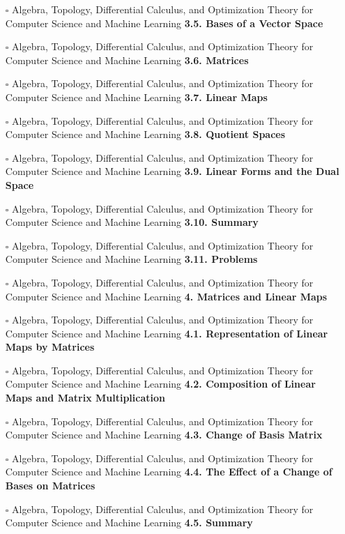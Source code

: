\documentclass[a4, landscape, 12pt]{article}
\newcommand{\checkbox}{$\square$}%
\begin{document}
\begin{itemize}
{}
\item [\checkbox]  Algebra, Topology, Differential Calculus, and Optimization Theory for Computer Science and Machine Learning \textbf{ 3.5. Bases of a Vector Space
}
\item [\checkbox]  Algebra, Topology, Differential Calculus, and Optimization Theory for Computer Science and Machine Learning \textbf{ 3.6. Matrices
}
\item [\checkbox]  Algebra, Topology, Differential Calculus, and Optimization Theory for Computer Science and Machine Learning \textbf{ 3.7. Linear Maps
}
\item [\checkbox]  Algebra, Topology, Differential Calculus, and Optimization Theory for Computer Science and Machine Learning \textbf{ 3.8. Quotient Spaces
}
\item [\checkbox]  Algebra, Topology, Differential Calculus, and Optimization Theory for Computer Science and Machine Learning \textbf{ 3.9. Linear Forms and the Dual Space
}
\item [\checkbox]  Algebra, Topology, Differential Calculus, and Optimization Theory for Computer Science and Machine Learning \textbf{ 3.10. Summary
}
\item [\checkbox]  Algebra, Topology, Differential Calculus, and Optimization Theory for Computer Science and Machine Learning \textbf{ 3.11. Problems
}
\item [\checkbox]  Algebra, Topology, Differential Calculus, and Optimization Theory for Computer Science and Machine Learning \textbf{ 4. Matrices and Linear Maps
}
\item [\checkbox]  Algebra, Topology, Differential Calculus, and Optimization Theory for Computer Science and Machine Learning \textbf{ 4.1. Representation of Linear Maps by Matrices
}
\item [\checkbox]  Algebra, Topology, Differential Calculus, and Optimization Theory for Computer Science and Machine Learning \textbf{ 4.2. Composition of Linear Maps and Matrix Multiplication
}
\item [\checkbox]  Algebra, Topology, Differential Calculus, and Optimization Theory for Computer Science and Machine Learning \textbf{ 4.3. Change of Basis Matrix
}
\item [\checkbox]  Algebra, Topology, Differential Calculus, and Optimization Theory for Computer Science and Machine Learning \textbf{ 4.4. The Effect of a Change of Bases on Matrices
}
\item [\checkbox]  Algebra, Topology, Differential Calculus, and Optimization Theory for Computer Science and Machine Learning \textbf{ 4.5. Summary
}
\end{itemize}
\end{document}
